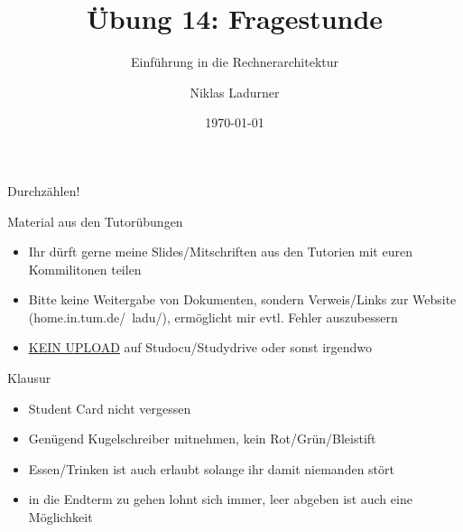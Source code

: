 \documentclass[
  german,            %
  aspectratio=169,    %
]{tumbeamer}
\title{Übung 14: Fragestunde}
\subtitle{Einführung in die Rechnerarchitektur}
\author{Niklas Ladurner}
\institute{\theChairName\\\theDepartmentName\\\theUniversityName}
\date[\today]{\today}
\begin{document}
\maketitle

\begin{frame}[c]{}{}
  \begin{center}
    \LARGE  Durchzählen!
  \end{center}
\end{frame}

\begin{frame}[fragile, c]{Material aus den Tutorübungen}{}
  \begin{itemize}
    \item Ihr dürft gerne meine Slides/Mitschriften aus den Tutorien mit 
    euren Kommilitonen teilen
    \item Bitte keine Weitergabe von Dokumenten, sondern Verweis/Links zur Website (home.in.tum.de/~ladu/), 
    ermöglicht mir evtl. Fehler auszubessern
    \item \underline{KEIN UPLOAD} auf Studocu/Studydrive oder sonst irgendwo
  \end{itemize}
\end{frame}

\begin{frame}[fragile, c]{Klausur}{}
\begin{itemize}
  \item Student Card nicht vergessen
  \item Genügend Kugelschreiber mitnehmen, kein Rot/Grün/Bleistift
  \item Essen/Trinken ist auch erlaubt solange ihr damit niemanden stört
  \item in die Endterm zu gehen lohnt sich immer, leer abgeben ist auch eine Möglichkeit
\end{itemize}
\end{frame}
\end{document}
